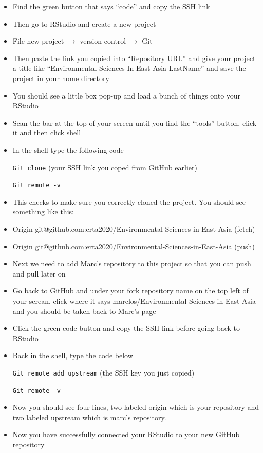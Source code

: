 \documentclass[12pt]{../SOP4_alpha}\usepackage[]{graphicx}\usepackage[]{color}
\begin{document}
\begin{itemize}
  \item Find the green button that says “code” and copy the SSH link 
  \item Then go to RStudio and create a new project
  \item File new project $\rightarrow$ version control $\rightarrow$ Git
  \item Then paste the link you copied into “Repository URL” and give your project a title like “Environmental-Sciences-In-East-Asia-LastName” and save the project in your home directory
    \item You should see a little box pop-up and load a bunch of things onto your RStudio
  \item Scan the bar at the top of your screen until you find the “tools” button, click it and then click shell
  \item In the shell type the following code

    \indent\verb"Git clone" (your SSH link you coped from GitHub earlier)
    
    \indent\verb"Git remote -v"
    
      \item This checks to make sure you correctly cloned the project. You should see something like this: 
        \item Origin git@github.com:erta2020/Environmental-Sciences-in-East-Asia (fetch)
        \item Origin git@github.com:erta2020/Environmental-Sciences-in-East-Asia (push)
    \item Next we need to add Marc’s repository to this project so that you can push and pull later on
      \item Go back to GitHub and under your fork repository name on the top left of your screan, click where it says marclos/Environmental-Sciences-in-East-Asia and you should be taken back to Marc’s page
      \item Click the green code button and copy the SSH link before going back to RStudio
      \item Back in the shell, type the code below
        
        \indent\verb"Git remote add upstream" (the SSH key you just copied)
        
        \indent\verb"Git remote -v"
       
      \item Now you should see four lines, two labeled origin which is your repository and two labeled upstream which is marc’s repository. 
      \item Now you have successfully connected your RStudio to your new GitHub repository 
\end{itemize}
\end{document}
